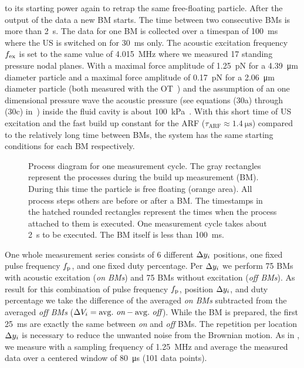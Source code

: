 to its starting power again to retrap the same free-floating particle. After 
the output of the data a new BM starts. The time between two consecutive BMs 
is more than \SI{2}{\s}. The data for one BM is collected over a timespan of 
\SI{100}{\ms} where the US is switched on for \SI{30}{\ms} only. The acoustic 
excitation frequency $f_{\mathrm{ex}}$ is set to the same value of \SI{4.015}{\mega\hertz} 
where we measured 17 standing pressure nodal planes. With a maximal force 
amplitude of \SI{1.25}{\pico\newton} for a \SI{4.39}{\um} diameter particle and 
a maximal force amplitude of \SI{0.17}{\pico\newton} for a \SI{2.06}{\um} 
diameter particle (both measured with the OT~\cite{Goering2021}) and the 
assumption of an one dimensional pressure wave the acoustic pressure (see 
equations (30a) through (30c) in~\cite{Bruus2012}) inside the fluid cavity is 
about \SI{100}{\kilo\pascal}~\cite{Goering2021}. With this short time of US 
excitation and the fast build up constant for the ARF 
($\tau_{\mathrm{ARF}}\approx \SI{1.4}{\us}$) compared to the relatively long 
time between BMs, the system has the same starting conditions for each BM 
respectively.

\begin{figure}[tbp]
  \centering
  \caption{Process diagram for one measurement cycle. The gray rectangles 
    represent the processes during the build up measurement (BM). During this 
    time the particle is free floating (orange area). All process steps others 
    are before or after a BM. The timestamps in the hatched rounded 
    rectangles represent the times when the process attached to them is 
    executed. One measurement cycle takes about \SI{2}{\s} to be executed. The 
  BM itself is less than \SI{100}{\ms}.}\label{fig:PU-flowchart}
\end{figure}

One whole measurement series consists of 6 different $\Delta y_{i}$ positions, one 
fixed pulse frequency $f_{\mathrm{p}}$, and one fixed duty percentage. Per $\Delta y_{i}$ we 
perform 75 BMs with acoustic excitation (\emph{on BMs}) and 75 BMs without 
excitation (\emph{off BMs}). As result for this combination of pulse frequency 
$f_{\mathrm{p}}$, position $\Delta y_{i}$, and duty percentage we take the difference of the 
averaged \emph{on BMs} subtracted from the averaged \emph{off BMs} ($\Delta V_{i}= 
{\mathrm{avg.~\emph{on}}} - {\mathrm{avg.~\emph{off}}}$). While the BM is 
prepared, the first \SI{25}{\ms} are exactly the same between \emph{on} and 
\emph{off} BMs. The repetition per location $\Delta y_{i}$ is necessary to reduce 
the unwanted noise from the Brownian motion. As in \cite{Goering2021}, we 
measure with a sampling frequency of \SI{1.25}{\mega\hertz} and average the 
measured data over a centered window of \SI{80}{\us} (101 data points).

